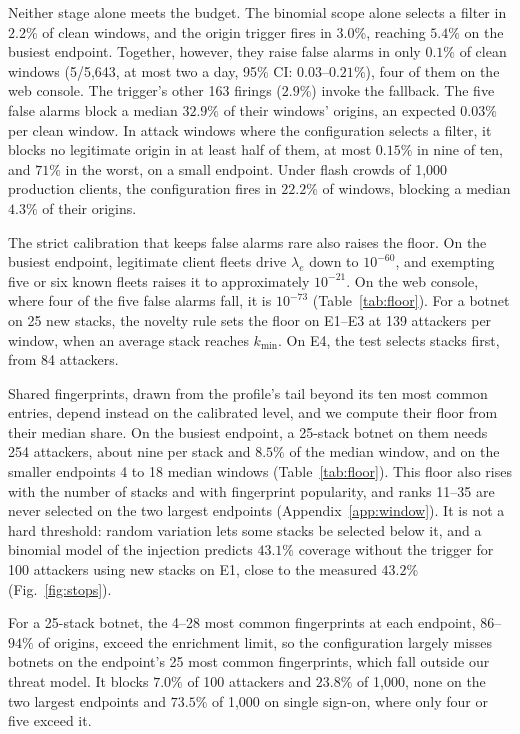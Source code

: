 \documentclass[conference,letterpaper,10pt]{IEEEtran}
\newcommand\1{\textit{(i)}}
\newcommand\2{\textit{(ii)}}
\newcommand\3{\textit{(iii)}}
\newcommand\4{\textit{(iv)}}
\newcommand\5{\textit{(v)}}
\newcommand\6{\textit{(vi)}}
\newcommand\7{\textit{(vii)}}
\newcommand\8{\textit{(viii)}}
\newcommand\9{\textit{(ix)}}
\begin{document}
Neither stage alone meets the budget. The binomial scope alone selects a filter in $2.2\%$ of clean windows, and the origin trigger fires in $3.0\%$, reaching $5.4\%$ on the busiest endpoint. Together, however, they raise false alarms in only $0.1\%$ of clean windows (5/5,643, at most two a day, 95\% CI: $0.03$--$0.21\%$), four of them on the web console.  The trigger's other 163 firings ($2.9\%$) invoke the fallback. The five false alarms block a median $32.9\%$ of their windows' origins, an expected $0.03\%$ per clean window. In attack windows where the configuration selects a filter, it blocks no legitimate origin in at least half of them, at most $0.15\%$ in nine of ten, and $71\%$ in the worst, on a small endpoint. Under flash crowds of 1,000 production clients, the configuration fires in $22.2\%$ of windows, blocking a median $4.3\%$ of their origins.

The strict calibration that keeps false alarms rare also raises the floor. On the busiest endpoint, legitimate client fleets drive $\lambda_e$ down to $10^{-60}$, and exempting five or six known fleets raises it to approximately $10^{-21}$. On the web console, where four of the five false alarms fall, it is $10^{-73}$ (Table~\ref{tab:floor}). For a botnet on 25 new stacks, the novelty rule sets the floor on E1--E3 at 139 attackers per window, when an average stack reaches $k_{\min}$. On E4, the test selects stacks first, from 84 attackers.

Shared fingerprints, drawn from the profile's tail beyond its ten most common entries, depend instead on the calibrated level, and we compute their floor from their median share. On the busiest endpoint, a 25-stack botnet on them needs 254 attackers, about nine per stack and $8.5\%$ of the median window, and on the smaller endpoints 4 to 18 median windows (Table~\ref{tab:floor}). This floor also rises with the number of stacks and with fingerprint popularity, and ranks 11--35 are never selected on the two largest endpoints (Appendix~\ref{app:window}). It is not a hard threshold: random variation lets some stacks be selected below it, and a binomial model of the injection predicts $43.1\%$ coverage without the trigger for 100 attackers using new stacks on E1, close to the measured $43.2\%$ (Fig.~\ref{fig:stops}).

For a 25-stack botnet, the 4--28 most common fingerprints at each endpoint, $86$--$94\%$ of origins, exceed the enrichment limit, so the configuration largely misses botnets on the endpoint's 25 most common fingerprints, which fall outside our threat model. It blocks $7.0\%$ of 100 attackers and $23.8\%$ of 1,000, none on the two largest endpoints and $73.5\%$ of 1,000 on single sign-on, where only four or five exceed it.
\end{document}
